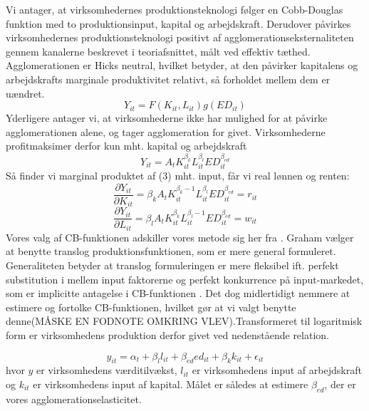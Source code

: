 Vi antager, at virksomhedernes produktionsteknologi følger en Cobb-Douglas funktion med to produktionsinput, kapital og arbejdskraft. Derudover påvirkes virksomhedernes produktionsteknologi positivt af agglomerationseksternaliteten gennem kanalerne beskrevet i teoriafsnittet, målt ved effektiv tæthed. Agglomerationen er Hicks neutral, hvilket betyder, at den påvirker kapitalens og arbejdskrafts marginale produktivitet relativt, så forholdet mellem dem er uændret.
\begin{equation}
Y_{it} = F(K_{it},L_{it})g(ED_{it}) 
\end{equation}
Yderligere antager vi, at virksomhederne ikke har mulighed for at påvirke agglomerationen alene, og tager agglomeration for givet.  Virksomhederne profitmaksimer derfor kun mht. kapital og arbejdskraft
\begin{equation}
	Y_{it} = A_t K_{it}^{\beta_k} L_{it}^{\beta_l} 
	ED_{it}^{\beta_{ed}}  
\end{equation}
Så finder vi marginal produktet af (3) mht. input, får vi real lønnen og renten: 
\begin{equation}
\frac{\partial Y_{it}}{\partial K_{it}} = \beta_k A_t K_{it}^{\beta_k-1} L_{it}^{\beta_l} 
ED_{it}^{\beta_{ed}}=r_{it}
\end{equation}
\begin{equation}
\frac{\partial Y_{it}}{\partial L_{it}} = \beta_l A_t K_{it}^{\beta_k} L_{it}^{\beta_l-1} 
ED_{it}^{\beta_{ed}} = w_{it}
\end{equation}
 Vores valg af CB-funktionen adskiller vores metode sig her fra \cite{graham2007agglomeration}. Graham vælger at benytte translog produktionsfunktionen, som er mere general formuleret. Generaliteten betyder at translog formuleringen er mere fleksibel ift. perfekt substitution i mellem input faktorerne og perfekt konkurrence på input-markedet, som er implicitte antagelse i CB-funktionen \cite{pavelescu2011some}. Det dog midlertidigt nemmere at estimere og fortolke CB-funktionen, hvilket gør at vi valgt benytte denne(MÅSKE EN FODNOTE OMKRING VLEV).Transformeret til logaritmisk form er virksomhedens produktion derfor givet ved nedenstående relation.


\begin{equation}
	y_{it} = \alpha_t + \beta_l l_{it} + \beta_{ed} ed_{it} + \beta_{k} k_{it} + \epsilon_{it}
	\label{eq:prodfunk_ED_01}
\end{equation}
hvor $y$ er virksomhedens værditilvækst, $l_{it}$ er virksomhedens input af arbejdskraft og $k_{it}$ er virksomhedens input af kapital. Målet er således at estimere $\beta_{ed}$, der er vores agglomerationselasticitet.

